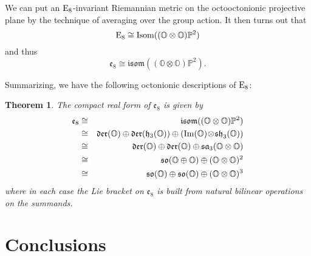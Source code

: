 \documentclass[12pt]{article}
\renewcommand\O{{\mathbb O}}
\renewcommand\P{{\mathbb P}}
\newcommand{\E}{{\rm E}}
\newcommand{\so}{{\mathfrak {so}}}
\newcommand{\e}{{\mathfrak {e}}}
\newcommand{\sa}{{\mathfrak {sa}}}
\newcommand{\h}{{\mathfrak {h}}}
\newcommand{\sh}{{\mathfrak {sh}}}
\newcommand{\isom}{{\mathfrak {isom}}}
\newcommand{\Isom}{{\rm Isom}}
\newcommand{\Der}{{\mathfrak {der}}}
\newcommand{\et}{\hspace{-0.08in}{\bf .}\hspace{0.1in}}
\renewcommand{\Im}{{\rm Im}}
\newcommand{\tensor}{\otimes}
\newcommand{\iso}{\cong}
\newcommand{\ban}{\begin{eqnarray*}}
\newcommand{\ean}{\end{eqnarray*}}
\newtheorem{thm}{Theorem}
\begin{document}
We can put an $\E_8$-invariant Riemannian metric on the octooctonionic
projective plane by the technique of averaging over the group action.
It then turns out \cite{Besse} that 
\[        \E_8 \iso \Isom((\O \tensor \O)\P^2)   \]
and thus 
\[       \e_8 \iso \isom((\O \tensor \O)\P^2)  . \label{e8.7} \]
   
Summarizing, we have the following octonionic descriptions of 
$\E_8$:
\begin{thm} \et \label{e8-description}  The compact real form of    
$\e_8$ is given by    
\ban   
\e_8 &\iso& \isom((\O \tensor \O)\P^2)    \\  
     &\iso& \Der(\O) \oplus \Der(\h_3(\O)) \oplus    
            (\Im(\O) \!\tensor\! \sh_3(\O)) \\   
     &\iso&  \Der(\O) \oplus \Der(\O) \oplus \sa_3(\O \tensor \O) \\   
     &\iso& \so(\O \oplus \O) \oplus (\O \tensor \O)^2 \\   
     &\iso& \so(\O) \oplus \so(\O) \oplus (\O \tensor \O)^3     
\ean   
where in each case the Lie bracket on $\e_8$ is built from    
natural bilinear operations on the summands.     
\end{thm}   

\section{Conclusions} 
\end{document}
